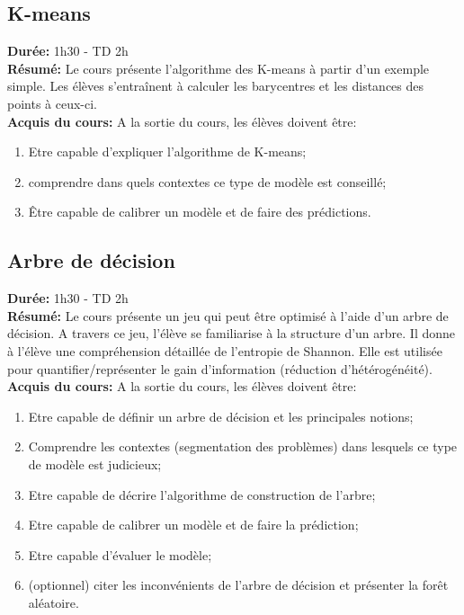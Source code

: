 \documentclass[12pt,a4paper]{article}
\begin{document}
\subsection{K-means}

\textbf{Durée:} 1h30 - TD 2h\\
\textbf{Résumé:} Le cours présente l’algorithme des K-means à partir d’un exemple simple. Les élèves s’entraînent à calculer les barycentres et les distances des points à ceux-ci.\\
\textbf{Acquis du cours:} A la sortie du cours, les élèves doivent être:
\begin{enumerate}
\item Etre capable d’expliquer l’algorithme de K-means;
\item comprendre dans quels contextes ce type de modèle est conseillé;
\item Être capable de calibrer un modèle et de faire des prédictions.
\end{enumerate}

\subsection{Arbre de décision}

\textbf{Durée:} 1h30 - TD 2h\\
\textbf{Résumé:} Le cours présente un jeu qui peut être optimisé à l’aide d’un arbre de décision. A travers ce jeu, l’élève se familiarise à la structure d’un arbre. Il donne à l’élève une compréhension détaillée de l’entropie de Shannon. Elle est utilisée pour quantifier/représenter le gain d’information (réduction d’hétérogénéité).\\
\textbf{Acquis du cours:} A la sortie du cours, les élèves doivent être:
\begin{enumerate}
\item Etre capable de définir un arbre de décision et les principales notions; 
\item Comprendre les contextes (segmentation des problèmes) dans lesquels ce type de modèle est judicieux;
\item Etre capable de décrire l’algorithme de construction de l’arbre;
\item Etre capable de calibrer un modèle et de faire la prédiction;
\item Etre capable d’évaluer le modèle;
\item (optionnel) citer les inconvénients de l’arbre de décision et présenter la forêt aléatoire.
\end{enumerate}
\end{document}
